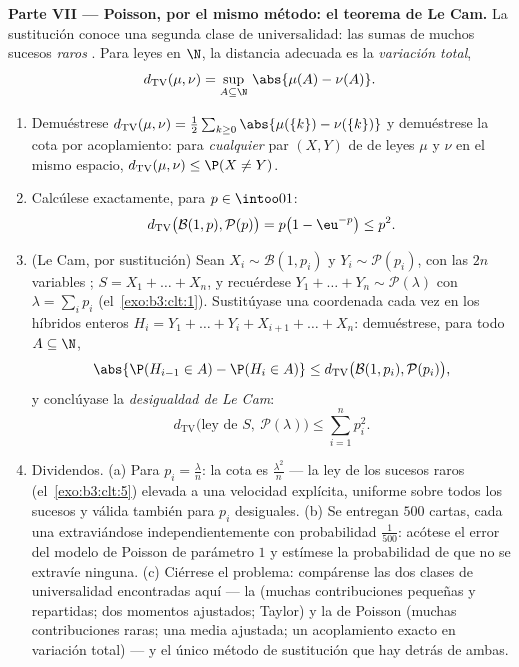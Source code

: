 \begin{problem}
\medskip
\noindent\textbf{Parte VII --- Poisson, por el mismo método: el teorema
de Le Cam.} La sustitución conoce una segunda clase de universalidad:
las sumas de muchos sucesos \emph{raros}
. Para leyes en
$\N$, la distancia adecuada es la \emph{variación total},
\[
d_{\mathrm{TV}}(\mu, \nu) = \sup_{A\subseteq\N}\,
\abs{\mu(A) - \nu(A)} .
\]
\begin{enumerate}[resume]
  \item Demuéstrese $d_{\mathrm{TV}}(\mu, \nu) =
        \frac12\sum_{k\geq0}\abs{\mu(\{k\}) -
        \nu(\{k\})}$ y demuéstrese la cota por acoplamiento: para
  \emph{cualquier} par $(X, Y)$ de
   de leyes $\mu$
  y $\nu$ en el mismo espacio,
        $d_{\mathrm{TV}}(\mu, \nu) \leq \P(X \neq Y)$.
  \item Calcúlese exactamente, para $p \in \intoo01$:
        \[
        d_{\mathrm{TV}}\bigl(\mathcal B(1, p), \mathcal
        P(p)\bigr) = p\bigl(1 - \eu^{-p}\bigr) \leq p^2 .
        \]
  \item (Le Cam, por sustitución) Sean $X_i \sim \mathcal B(1,
        p_i)$ y $Y_i \sim \mathcal P(p_i)$, con las $2n$ variables
  ;
  $S = X_1 + \dots + X_n$, y recuérdese
  $Y_1 + \dots + Y_n \sim \mathcal P(\lambda)$ con $\lambda = \sum_ip_i$
  (el~\cref{exo:b3:clt:1}). Sustitúyase una coordenada cada vez en los
  híbridos enteros $H_i = Y_1 + \dots + Y_i + X_{i+1} + \dots
        + X_n$: demuéstrese, para todo $A \subseteq \N$,
        \[
        \abs{\P(H_{i-1} \in A) - \P(H_i \in A)} \leq
        d_{\mathrm{TV}}\bigl(\mathcal B(1, p_i), \mathcal
        P(p_i)\bigr),
        \]
        y conclúyase la \emph{desigualdad de Le Cam}:
        \[
        d_{\mathrm{TV}}\bigl(\text{ley de } S,\ \mathcal
        P(\lambda)\bigr) \leq \sum_{i=1}^np_i^2 .
        \]
  \item Dividendos. (a) Para $p_i = \frac\lambda n$: la cota es
  $\frac{\lambda^2}n$ --- la ley de los sucesos raros
  (el~\cref{exo:b3:clt:5}) elevada a una velocidad explícita, uniforme
  sobre todos los sucesos y válida también para $p_i$ desiguales. (b) Se
  entregan $500$ cartas, cada una extraviándose independientemente con
  probabilidad $\frac1{500}$: acótese el error del modelo de Poisson de
  parámetro $1$ y estímese la probabilidad de que no se extravíe
  ninguna. (c) Ciérrese el problema: compárense las dos clases de
  universalidad encontradas aquí --- la
   (muchas contribuciones
  pequeñas y repartidas; dos momentos ajustados; Taylor) y la de Poisson
  (muchas contribuciones raras; una media ajustada; un acoplamiento
  exacto en variación total) --- y el único método de sustitución que
  hay detrás de ambas.


\end{enumerate}
\end{problem}
